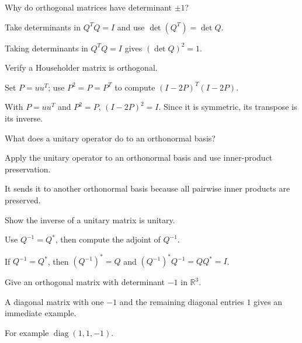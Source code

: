 \begin{exercise}\label{exr:i15-02}
Why do orthogonal matrices have determinant $\pm1$?
\end{exercise}
\begin{hint}
Take determinants in \(Q^TQ=I\) and use \(\det(Q^T)=\det Q\).
\end{hint}
\begin{solution}
Taking determinants in $Q^TQ=I$ gives $(\det Q)^2=1$.
\end{solution}

\begin{exercise}\label{exr:i15-03}
Verify a Householder matrix is orthogonal.
\end{exercise}
\begin{hint}
Set \(P=uu^T\); use \(P^2=P=P^T\) to compute \((I-2P)^T(I-2P)\).
\end{hint}
\begin{solution}
With $P=uu^T$ and $P^2=P$, $(I-2P)^2=I$. Since it is symmetric, its transpose is its inverse.
\end{solution}

\begin{exercise}\label{exr:i15-04}
What does a unitary operator do to an orthonormal basis?
\end{exercise}
\begin{hint}
Apply the unitary operator to an orthonormal basis and use inner-product preservation.
\end{hint}
\begin{solution}
It sends it to another orthonormal basis because all pairwise inner products are preserved.
\end{solution}

\begin{exercise}\label{exr:i15-05}
Show the inverse of a unitary matrix is unitary.
\end{exercise}
\begin{hint}
Use \(Q^{-1}=Q^*\), then compute the adjoint of \(Q^{-1}\).
\end{hint}
\begin{solution}
If $Q^{-1}=Q^*$, then $(Q^{-1})^*=Q$ and $(Q^{-1})^*Q^{-1}=QQ^*=I$.
\end{solution}

\begin{exercise}\label{exr:i15-06}
Give an orthogonal matrix with determinant $-1$ in $\mathbb R^3$.
\end{exercise}
\begin{hint}
A diagonal matrix with one \(-1\) and the remaining diagonal entries \(1\) gives an immediate example.
\end{hint}
\begin{solution}
For example $\operatorname{diag}(1,1,-1)$.
\end{solution}

